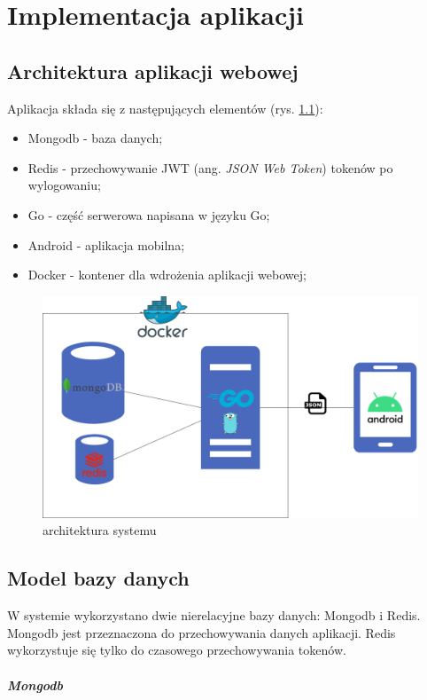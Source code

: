 \chapter{Implementacja aplikacji}
%
\section{Architektura aplikacji webowej}
Aplikacja składa się z następujących elementów (rys. \ref{fig:systemarchitecturediagram}):
\begin{itemize}
\item Mongodb - baza danych;
\item Redis \cite{redis} - przechowywanie JWT (ang. \textit{JSON Web Token}) \cite{jwt} tokenów po wylogowaniu;
\item Go - część serwerowa napisana w języku Go;
\item Android - aplikacja mobilna;
\item Docker - kontener dla wdrożenia aplikacji webowej;
\end{itemize}
\begin{figure}[ht]
\centering
\includegraphics[width=0.8\linewidth]{rys03/system_architecture_diagram.png}
\caption{architektura systemu \cite{diagrams_net}}
\label{fig:systemarchitecturediagram}
\end{figure}
\section{Model bazy danych}
W systemie wykorzystano dwie nierelacyjne bazy danych: Mongodb i Redis.
Mongodb jest przeznaczona do przechowywania danych aplikacji.
Redis wykorzystuje się tylko do czasowego przechowywania tokenów.

\paragraph{Mongodb}

